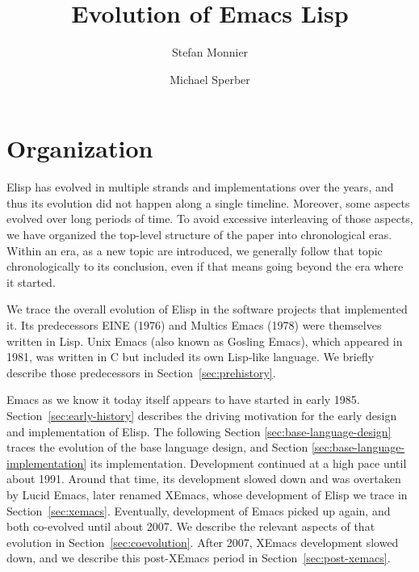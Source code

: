 \documentclass[format=acmsmall, review=false, screen=true]{acmart}
\newcommand \Elisp {Elisp}
\begin{document}
\title{Evolution of Emacs Lisp}

\author{Stefan Monnier}
\author{Michael Sperber}





%
%




\maketitle

\section{Organization}

\Elisp{} has evolved in multiple strands and implementations over the
years, and thus its evolution did not happen along a single timeline.
Moreover, some aspects evolved over long periods of time.  To avoid
excessive interleaving of those aspects, we have organized the
top-level structure of the paper into chronological eras.  Within an
era, as a new topic are introduced, we generally follow that topic
chronologically to its conclusion, even if that means going beyond the
era where it started.

We trace the overall evolution of \Elisp{} in the software projects that
implemented it.  Its predecessors EINE (1976) and Multics Emacs (1978) were
themselves written in Lisp.  Unix Emacs (also known as Gosling Emacs), which
appeared in 1981, was written in C but included its own Lisp-like language.
We briefly describe those predecessors in Section~\ref{sec:prehistory}.

Emacs as we know it today itself appears to have started in early 1985.  
Section~\ref{sec:early-history} describes the driving motivation for
the early design and implementation of \Elisp.  The following Section
\ref{sec:base-language-design} traces the evolution of the base
language design, and Section \ref{sec:base-language-implementation}
its implementation.
Development continued at a high pace until about 1991.
Around that time, its development slowed down and
was overtaken by Lucid Emacs, later renamed XEmacs, whose development of
\Elisp{} we trace in Section~\ref{sec:xemacs}.  Eventually,
development of Emacs picked up again, and both co-evolved until about
2007.  We describe the relevant aspects of that evolution in
Section~\ref{sec:coevolution}.  After 2007, XEmacs development slowed
down, and we describe this post-XEmacs period in
Section~\ref{sec:post-xemacs}.
\end{document}
